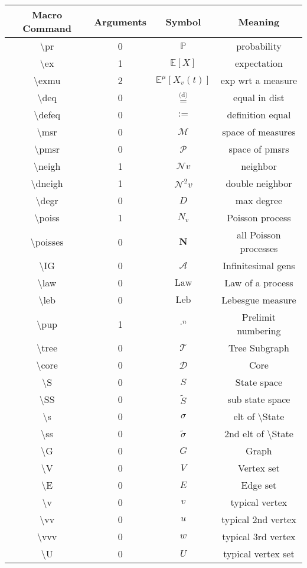 \documentclass[12pt]{article}
\newcommand{\mb}{\mathbb}
\newcommand{\mc}{\mathcal}
\newcommand{\te}{\text}
\newcommand{\tbs}{\textbackslash}
\newcommand{\pr}{\mb{P}}							%
\newcommand{\ex}[1]{\mb{E}\left[#1\right]}			%
\newcommand{\exmu}[2]{\mb{E}^{#1}\left[#2\right]}	%
\newcommand{\deq}{\overset{\text{(d)}}{=}}			%
\newcommand{\defeq}{:=}								%
\newcommand{\msr}{\mc{M}}							%
\newcommand{\pmsr}{\mc{P}}							%
\newcommand{\neigh}{\mc{N}}					%
\newcommand{\dneigh}{\mc{N}^2}				%
\renewcommand{\v}{v}							%
\newcommand{\vv}{u}								%
\newcommand{\vvv}{w}							%
\renewcommand{\U}{U}							%
\renewcommand{\S}{S}							%
\newcommand{\s}{\sigma}							%
\renewcommand{\t}{t}							%
\renewcommand{\ss}[1]{^{#1}}					%
\newcommand{\degr}{D}								%
\newcommand{\poiss}[1]{N_{#1}}						%
\newcommand{\poisses}{\mathbf{N}}				%
\newcommand{\IG}{\mc{A}}						%
\newcommand{\law}{\te{Law}}							%
\newcommand{\leb}{\te{Leb}}							%
\newcommand{\pup}[1]{^{#1}}							%
\newcommand{\tree}{\mc{T}}							%
\newcommand{\core}{\mc{D}}							%
\renewcommand{\SS}{\tilde{\S}}						%
\renewcommand{\ss}{\tilde{\s}}					%
\renewcommand{\G}{G}								%
\newcommand{\V}{V}									%
\newcommand{\E}{E}									%
\newcommand{\rxvt}[2]{X_{#1}{(#2)}}					%
\newcommand{\m}[3]{\mu_{#2#1}^{#3}}						%
\begin{document}
\begin{longtable}{c|c|c|c}
Macro Command & Arguments & Symbol & Meaning\\\hline
\tbs pr&0&\(\pr\)	& probability\\
\tbs ex&1&\(\ex{X}\)	&expectation\\
\tbs exmu&2&\(\exmu{\m{}{}{}}{\rxvt{\v}{\t}}\)	&exp wrt a measure\\
\tbs deq&0&\(\deq\)		&equal in dist\\
\tbs defeq&0&\(\defeq\)							&definition equal\\
\tbs msr&0&\(\msr\)							&space of measures\\
\tbs pmsr&0&\(\pmsr\)						&space of pmsrs\\
\tbs neigh&1&\(\neigh{\v}\)				&neighbor\\
\tbs dneigh&1&\(\dneigh{\v}\)				&double neighbor\\
\tbs degr&0&\(\degr\)								&max degree\\
\tbs poiss&1&\(\poiss{\v}\)						&Poisson process\\
\tbs poisses&0&\(\poisses\)					&all Poisson processes\\
\tbs IG&0&\(\IG\)					&Infinitesimal gens\\
\tbs law&0&\(\law\)							&Law of a process\\
\tbs leb&0&\(\leb\)							&Lebesgue measure\\
\tbs pup&1&\(\cdot\pup{n}\)						&Prelimit numbering\\
\tbs tree&0&\(\tree\)							&Tree Subgraph\\
\tbs core&0&\(\core\)							&Core\\
\tbs S&0&\(\S\)							&State space\\
\tbs SS&0&\(\SS\)						&sub state space\\
\tbs s&0&\(\s\)								&elt of \tbs State\\
\tbs ss&0&\(\ss\)						&2nd elt of \tbs State\\
\tbs G&0&\(\G\)								&Graph\\
\tbs V&0&\(\V\)									&Vertex set\\
\tbs E&0&\(\E\)									&Edge set\\
\tbs v&0&\(\v\)								&typical vertex\\
\tbs vv&0&\(\vv\)									&typical 2nd vertex\\
\tbs vvv&0&\(\vvv\)								&typical 3rd vertex\\
\tbs U&0&\(\U\)									&typical vertex set\\

\end{longtable}
\end{document}
